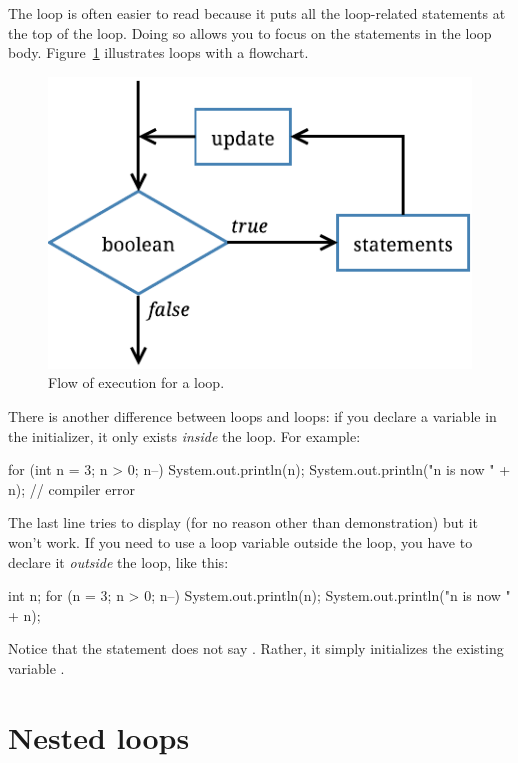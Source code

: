 The  loop is often easier to read because it puts all the loop-related statements at the top of the loop.
Doing so allows you to focus on the statements in the loop body.
Figure~\ref{fig.for} illustrates  loops with a flowchart.

\begin{figure}[!ht]
\begin{center}
\includegraphics[scale=0.9]{figs/for.pdf}
\caption{Flow of execution for a  loop.}
\label{fig.for}
\end{center}
\end{figure}

There is another difference between  loops and  loops: if you declare a variable in the initializer, it only exists {\em inside} the  loop.
For example:

\begin{code}
for (int n = 3; n > 0; n--) {
    System.out.println(n);
}
System.out.println("n is now " + n);  // compiler error
\end{code}

The last line tries to display  (for no reason other than demonstration) but it won't work.
If you need to use a loop variable outside the loop, you have to declare it {\em outside} the loop, like this:

\begin{code}
int n;
for (n = 3; n > 0; n--) {
    System.out.println(n);
}
System.out.println("n is now " + n);
\end{code}

Notice that the  statement does not say .
Rather, it simply initializes the existing variable .


\section{Nested loops}
\label{nested}

